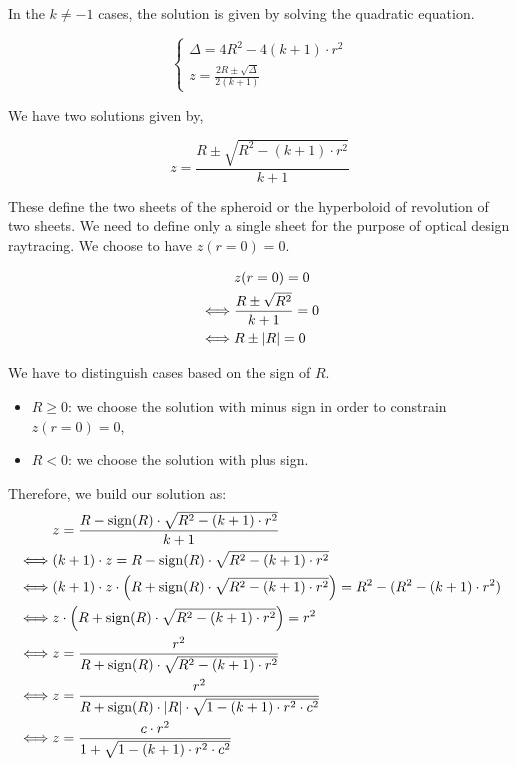 In the $k\neq-1$ cases, the solution is given by solving the quadratic equation.

\begin{equation} \begin{cases}
\Delta = 4 R^2 - 4 (k+1) \cdot r^2 \\
z = \frac{2R \pm \sqrt{\Delta}}{2(k+1)}
\end{cases} \end{equation}

We have two solutions given by,

\begin{equation}
z = \frac{R \pm \sqrt{R^2 - (k+1) \cdot r^2}}{k + 1}
\end{equation}

These define the two sheets of the spheroid or the hyperboloid of revolution of
two sheets. We need to define only a single sheet for the purpose of optical
design raytracing. We choose to have $z(r=0) = 0$.

\begin{equation} \begin{split}
& z(r=0) = 0 \\
\iff & \frac{R \pm \sqrt{R^2}}{k+1} = 0 \\
\iff & R \pm \abs{R} = 0
\end{split} \end{equation}

We have to distinguish cases based on the sign of $R$.
\begin{itemize}
\item $R \geq 0$: we choose the solution with minus sign in order to constrain
                  $z(r=0)=0$,
\item $R < 0$: we choose the solution with plus sign.
\end{itemize}

Therefore, we build our solution as:
\begin{equation} \begin{split}
& z = \frac{R - \textrm{sign}(R) \cdot \sqrt{R^2 - (k+1) \cdot r^2}}{k+1} \\
\iff & (k+1) \cdot z = R - \textrm{sign}(R) \cdot \sqrt{R^2 - (k+1) \cdot r^2}\\
\iff & (k+1) \cdot z \cdot \left( R + \textrm{sign}(R) \cdot
       \sqrt{R^2 - (k+1) \cdot r^2} \right) = R^2 - (R^2 - (k+1) \cdot r^2) \\
\iff & z \cdot \left( R + \textrm{sign}(R) \cdot
       \sqrt{R^2 - (k+1) \cdot r^2} \right) = r^2 \\
\iff & z = \frac{r^2}{R + \textrm{sign}(R) \cdot \sqrt{R^2 - (k+1) \cdot r^2}}\\
\iff & z = \frac{r^2}{R + \textrm{sign}(R) \cdot \abs{R} \cdot
                      \sqrt{1 - (k+1) \cdot r^2 \cdot c^2}} \\
\iff & z = \frac{c \cdot r^2}{1 + \sqrt{1 - (k+1) \cdot r^2 \cdot c^2}}
\end{split} \end{equation}


